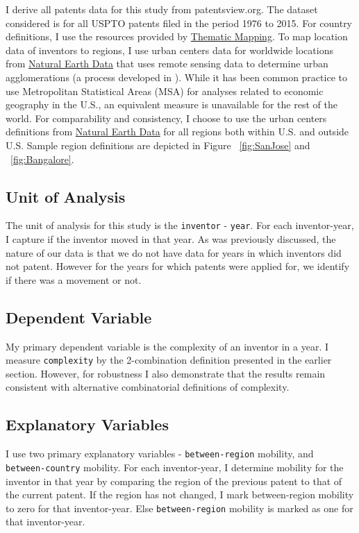 \documentclass[12pt]{article}
\begin{document}
I derive all patents data for this study from patentsview.org. The dataset considered is for all USPTO patents filed in the period 1976 to 2015. For country definitions, I use the resources provided by \href{http://thematicmapping.org/downloads/world_borders.php}{Thematic Mapping}. To map location data of inventors to regions, I use urban centers data for worldwide locations from \href{http://www.naturalearthdata.com/downloads/10m-cultural-vectors/}{Natural Earth Data} that uses remote sensing data to determine urban agglomerations (a process developed in \cite{Schneider2003}).  While it has been common practice to use Metropolitan Statistical Areas (MSA) for analyses related to economic geography in the U.S., an equivalent measure is unavailable for the rest of the world. For comparability and consistency, I choose to use the urban centers definitions from \href{http://www.naturalearthdata.com/downloads/10m-cultural-vectors/}{Natural Earth Data} for all regions both within U.S. and outside U.S. Sample region definitions are depicted in Figure ~\ref{fig:SanJose} and ~\ref{fig:Bangalore}. 


\subsection{Unit of Analysis}
The unit of analysis for this study is the \verb|inventor| - \verb|year|. For each inventor-year, I capture if the inventor moved in that year. As was previously discussed, the nature of our data is that we do not have data for years in which inventors did not patent. However for the years for which patents were applied for, we identify if there was a movement or not.

\subsection{Dependent Variable}
My primary dependent variable is the complexity of an inventor in a year.  I measure \texttt{complexity} by the 2-combination definition presented in the earlier section. However, for robustness I also demonstrate that the results remain consistent with alternative combinatorial definitions of complexity. 

\subsection{Explanatory Variables}
I use two primary explanatory variables - \texttt{between-region} mobility, and \texttt{between-country} mobility.  For each inventor-year,  I  determine mobility for the inventor in that year by comparing the region  of the previous patent to that of the current patent. If the region has not changed, I mark between-region mobility to zero for that inventor-year. Else \texttt{between-region} mobility is marked as one for that inventor-year.\par
\end{document}
